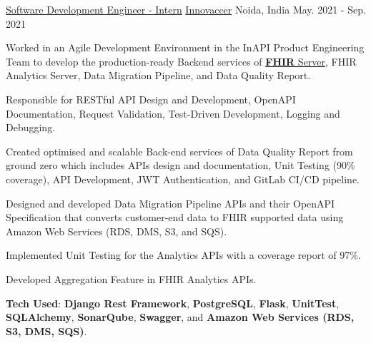 

\begin{cventries}

  \cventry
    {\href{https://nikhil-bhasin.netlify.app/data/LetterOfExperience_Innovaccer.pdf}{Software Development Engineer - Intern}} %
    {\href{https://innovaccer.com/}{Innovaccer}} %
    {Noida, India} %
    {May. 2021 - Sep. 2021} %
     {
      \begin{cvitems} %
        \item {Worked in an Agile Development Environment in the InAPI Product Engineering Team to develop the production-ready Backend services of \href{https://www.hl7.org/fhir/index.html}{\textbf{FHIR} Server}, FHIR Analytics Server, Data Migration Pipeline, and Data Quality Report.}
        \item {Responsible for RESTful API Design and Development, OpenAPI Documentation, Request Validation, Test-Driven Development, Logging and Debugging.}
        \item {Created optimised and scalable Back-end services of Data Quality Report from ground zero which includes APIs design and documentation, Unit Testing (90\% coverage), API Development, JWT Authentication, and GitLab CI/CD pipeline.}
        \item {Designed and developed Data Migration Pipeline APIs and their OpenAPI Specification that converts customer-end data to FHIR supported data using Amazon Web Services (RDS, DMS, S3, and SQS).}
        \item {Implemented Unit Testing for the Analytics APIs with a coverage report of 97\%.}
        \item {Developed Aggregation Feature in FHIR Analytics APIs.}
        \item {\textbf{Tech Used}: \textbf{Django Rest Framework}, \textbf{PostgreSQL}, \textbf{Flask}, \textbf{UnitTest}, \textbf{SQLAlchemy}, \textbf{SonarQube}, \textbf{Swagger}, and \textbf{Amazon Web Services (RDS, S3, DMS, SQS)}. }
      \end{cvitems}
    }


\end{cventries}
